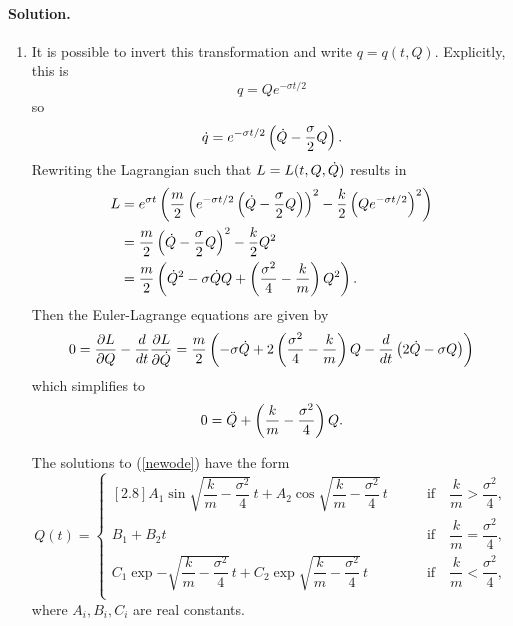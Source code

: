 \documentclass[11pt]{article}
\newcommand{\pder}[2]{\frac{\partial#1}{\partial#2}}
\newcommand{\der}[2]{\frac{d#1}{d#2}}
\newcommand{\refeq}[1]{(\ref{#1})}
\newenvironment{solution}
{
    \paragraph{Solution.}
    \ignorespaces
}
{
    \bigskip\bigskip
}
\begin{document}
\begin{enumerate}
\begin{solution}
\begin{enumerate}
		\item It is possible to invert this transformation and write $q = q(t, Q)$.  Explicitly, this is
			\begin{equation} \label{inversion}
				q = Q e^{-\sigma t / 2}
			\end{equation}
			so
			\begin{equation}
				\dot{q} = e^{-\sigma t / 2} \left(\dot{Q} - \frac{\sigma}{2} Q \right).
			\end{equation}
			Rewriting the Lagrangian such that $L = L(t, Q, \dot{Q})$ results in
			\begin{align}
				L &= e^{\sigma t} \left(\frac{m}{2} \left(e^{-\sigma t / 2} \left( \dot{Q} - \frac{\sigma}{2} Q \right) \right)^2 - \frac{k}{2} \left( Q e^{-\sigma t / 2} \right)^2 \right) \\
				&= \frac{m}{2} \left( \dot{Q} - \frac{\sigma}{2} Q \right)^2 - \frac{k}{2} Q^2 \\
				&= \label{lagrangian} \frac{m}{2} \left(\dot{Q}^2 - \sigma \dot{Q} Q + \left(\frac{\sigma^2}{4} - \frac{k}{m} \right) Q^2 \right).
			\end{align}
			Then the Euler-Lagrange equations are given by
			\begin{equation}
				0 = \pder{L}{Q} - \der{}{t} \pder{L}{\Qd} = \frac{m}{2} \left( -\sigma \Qd + 2 \left( \frac{\sigma^2}{4} - \frac{k}{m} \right) Q - \der{}{t} \left(2 \Qd - \sigma Q \right) \right)
			\end{equation}
			which simplifies to
			\begin{equation} \label{newode} 
				0 = \ddot{Q} + \left( \frac{k}{m} - \frac{\sigma^2}{4} \right) Q.
			\end{equation}
			
			The solutions to \refeq{newode} have the form
			\begin{equation}
				Q(t) = \begin{cases}[2.8]
						A_1 \sin\sqrt{\dfrac{k}{m} - \dfrac{\sigma^2}{4}}\,t + A_2 \cos\sqrt{\dfrac{k}{m} - \dfrac{\sigma^2}{4}}\,t \quad \quad &\text{if}\quad \dfrac{k}{m} > \dfrac{\sigma^2}{4}, \\
						B_1 + B_2 t \quad \quad &\text{if}\quad \dfrac{k}{m} = \dfrac{\sigma^2}{4}, \\
						C_1 \exp{-\sqrt{\dfrac{k}{m} - \dfrac{\sigma^2}{4}}\,t} + C_2 \exp{\sqrt{\dfrac{k}{m} - \dfrac{\sigma^2}{4}}\,t} \quad \quad &\text{if} \quad \dfrac{k}{m} < \dfrac{\sigma^2}{4}, \\
					\end{cases}
			\end{equation}
			where $A_i, B_i, C_i$ are real constants.
			

\end{enumerate}
\end{solution}
\end{enumerate}
\end{document}
